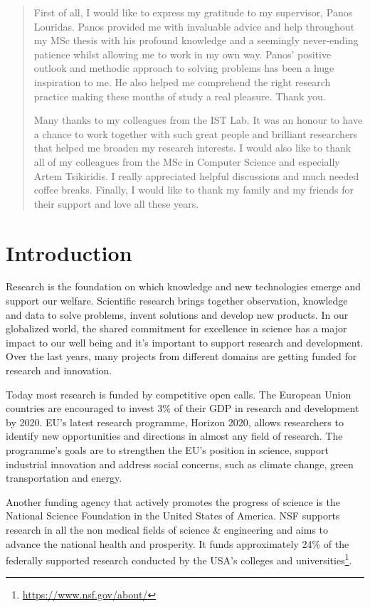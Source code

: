 \documentclass[12pt]{report}
\begin{document}
\renewcommand{\abstractname}{Acknowledgements}
\begin{abstract}
First of all, I would like to express my gratitude to my supervisor, Panos
Louridas. Panos provided me with invaluable advice and help throughout my MSc
thesis with his profound knowledge and a seemingly never-ending patience whilst
allowing me to work in my own way. Panos’ positive outlook and methodic approach
to solving problems has been a huge inspiration to me. He also helped me
comprehend the right research practice making these months of study a real
pleasure. Thank you.

Many thanks to my colleagues from the IST Lab. It was an honour to have a chance
to work together with such great people and brilliant researchers that helped me
broaden my research interests. I would also like to thank all of my colleagues
from the MSc in Computer Science and especially Artem Tsikiridis. I really
appreciated helpful discussions and much needed coffee breaks. Finally, I would
like to thank my family and my friends for their support and love all these
years.
\end{abstract}

\section{Introduction}
Research is the foundation on which knowledge and new technologies emerge and
support our welfare. Scientific research brings together observation, knowledge
and data to solve problems, invent solutions and develop new products. In our
globalized world, the shared commitment for excellence in science has a major
impact to our well being and it's important to support research and development.
Over the last years, many projects from different domains are getting funded for
research and innovation.

Today most research is funded by competitive open calls. 
The European Union countries are encouraged to
invest 3\% of their GDP in research and development by 2020. EU's
latest research programme, Horizon 2020, allows researchers to
identify new opportunities and directions in almost any field of
research. The programme's goals are to strengthen the EU's position in
science, support industrial innovation and address social concerns,
such as climate change, green transportation and energy.

Another funding agency that actively promotes the progress of science
is the National Science Foundation in the United States of America.
NSF supports research in all the non medical fields of science \&
engineering and aims to advance the national health and prosperity. It
funds approximately 24\% of the federally supported research
conducted by the USA's colleges and universities\footnote{\url{https://www.nsf.gov/about/}}.
\end{document}
